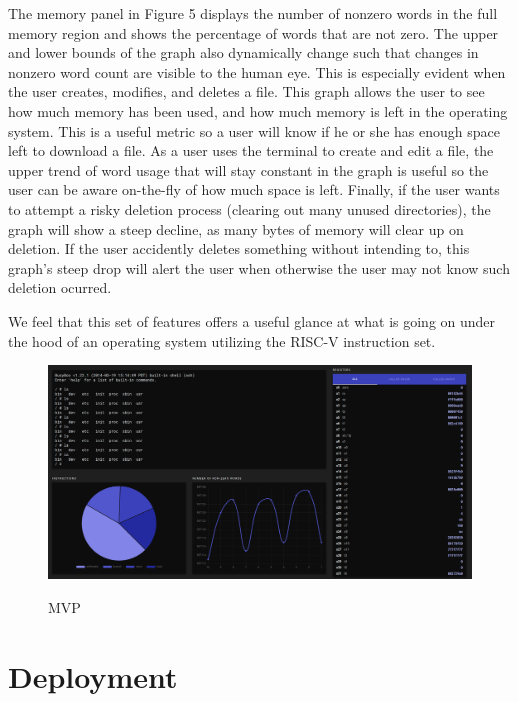 The memory panel in Figure 5 displays the number of nonzero words in the full memory region and shows the
percentage of words that are not zero. The upper and lower bounds of the graph also dynamically change such that
changes in nonzero word count are visible to the human eye. This is especially evident when the user creates, modifies,
and deletes a file. This graph allows the user to see how much memory has been used, and how much memory is left in
the operating system. This is a useful metric so a user will know if he or she has enough space left to download
a file. As a user uses the terminal to create and edit a file, the upper trend of word usage that will stay constant in
the graph is useful so the user can be aware on-the-fly of how much space is left. Finally, if the user wants to 
attempt a risky deletion process (clearing out many unused directories), the graph will show a steep decline,
as many bytes of memory will clear up on deletion. If the user accidently deletes something without intending to,
this graph's steep drop will alert the user when otherwise the user may not know such deletion ocurred.

We feel that this set of features offers a useful glance at what is going on under the hood
of an operating system utilizing the RISC-V instruction set.

\begin{figure}[H]
  \includegraphics[scale=0.13]{dashboard}
  \label{fig:mvp}
  \caption{MVP}
  \centering
\end{figure}



\section*{Deployment}

